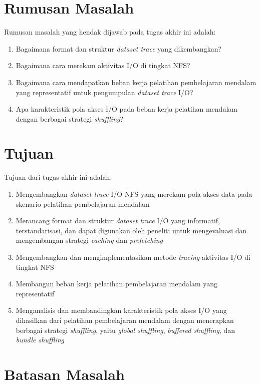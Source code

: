\section{Rumusan Masalah}

Rumusan masalah yang hendak dijawab pada tugas akhir ini adalah:

\begin{enumerate}
    \item Bagaimana format dan struktur \textit{dataset trace} yang dikembangkan?
    \item Bagaimana cara merekam aktivitas I/O di tingkat NFS?
    \item Bagaimana cara mendapatkan beban kerja pelatihan pembelajaran mendalam yang representatif untuk pengumpulan \textit{dataset trace} I/O?
    \item Apa karakteristik pola akses I/O pada beban kerja pelatihan mendalam dengan berbagai strategi \textit{shuffling}?
\end{enumerate}

\section{Tujuan}

Tujuan dari tugas akhir ini adalah:

\begin{enumerate}
    \item Mengembangkan \textit{dataset trace} I/O NFS yang merekam pola akses data pada skenario pelatihan pembelajaran mendalam
    \item Merancang format dan struktur \textit{dataset trace} I/O yang informatif, terstandarisasi, dan dapat digunakan oleh peneliti untuk mengevaluasi dan mengembangan strategi \textit{caching} dan \textit{prefetching}
    \item Mengembangkan dan mengimplementasikan metode \textit{tracing} aktivitas I/O di tingkat NFS
    \item Membangun beban kerja pelatihan pembelajaran mendalam yang representatif
    \item Menganalisis dan membandingkan karakteristik pola akses I/O yang dihasilkan dari pelatihan pembelajaran mendalam dengan menerapkan berbagai strategi \textit{shuffling}, yaitu \textit{global shuffling}, \textit{buffered shuffling}, dan \textit {bundle shuffling}
\end{enumerate}

\section{Batasan Masalah}


